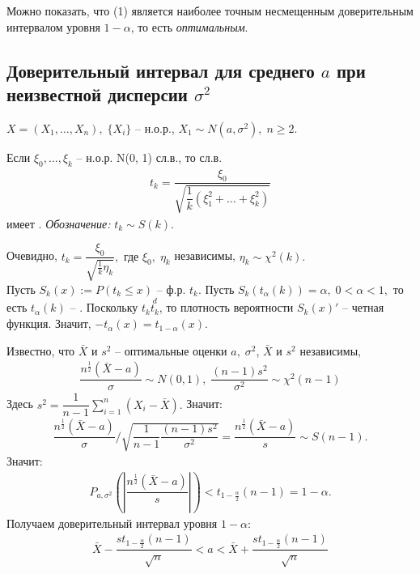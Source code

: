 Можно показать, что (1) является наиболее точным несмещенным доверительным интервалом уровня $ 1 - \alpha $, то есть \textit{оптимальным}.

\subsection*{Доверительный интервал для среднего $ a $ при неизвестной дисперсии $ \sigma^2 $}
 
$ X = (X_1, \ldots, X_n), \; \lbrace X_i \rbrace $ -- н.о.р., $ X_1 \sim N(a, \sigma^2), \; n \geq 2 $.

\begin{definition}\label{cha:9/def:1}
	Если $ \xi_0, \ldots, \xi_k $ -- н.о.р. N(0, 1) сл.в., то сл.в. $$ \begin{gathered} t_k = \dfrac{\xi_0}{\sqrt{\dfrac{1}{k}(\xi_1^2 + \ldots + \xi_k^2)}} \end{gathered} $$ имеет . \textit{Обозначение:} $ t_k \sim S(k)$.
\end{definition}

Очевидно, $ t_k = \dfrac{\xi_0}{\sqrt{\frac{1}{k}\eta_k}}, \text{ где } \xi_0, \; \eta_k  $ независимы, $ \eta_k \sim \chi^2(k). $\\

Пусть $ S_k(x) := P(t_k \leq x) $ -- ф.р. $ t_k .$ Пусть $ S_k(t_{\alpha}(k)) = \alpha, \; 0 < \alpha < 1,  $ то есть $ t_{\alpha}(k) $ -- . Поскольку $ t_k \stackrel{d}{t_k} $, то плотность вероятности $ S_k(x)' $ -- четная функция. Значит, $ -t_{\alpha}(x) = t_{1 - \alpha}(x) $.

Известно, что $ \bar{X} $ и $ s^2 $ -- оптимальные оценки $ a, \; \sigma^2 $, $ \bar{X} $ и $ s^2 $ независимы, 
$$ \begin{gathered} \dfrac{n^{\frac{1}{2}}(\bar{X} - a)}{\sigma} \sim N(0, 1), \; \dfrac{(n - 1)s^2}{\sigma^2} \sim \chi^2(n - 1) \end{gathered} $$ 
Здесь $ s^2 = \dfrac{1}{n -1}\sum\limits_{i = 1}^{n}(X_i - \bar{X}).  $ Значит: 
$$ \begin{gathered} \dfrac{n^{\frac{1}{2}}(\bar{X} - a)}{\sigma} / \sqrt{\dfrac{1}{n - 1} \dfrac{(n - 1)s^2}{\sigma^2}} = \dfrac{n^{\frac{1}{2}}(\bar{X} - a)}{s} \sim S(n - 1).  \end{gathered}$$
Значит: $$ \begin{gathered} P_{a, \sigma^2}(|\dfrac{n^{\frac{1}{2}}(\bar{X} - a)}{s}|) < t_{1 - \frac{\alpha}{2}}(n - 1) = 1 - \alpha. \end{gathered} $$ Получаем доверительный интервал уровня $ 1 - \alpha: $ $$ \begin{gathered} \bar{X} - \dfrac{st_{1 - \frac{\alpha}{2}}(n - 1)}{\sqrt{n}} < a < \bar{X} + \dfrac{st_{1 - \frac{\alpha}{2}}(n - 1)}{\sqrt{n}} \end{gathered} $$

